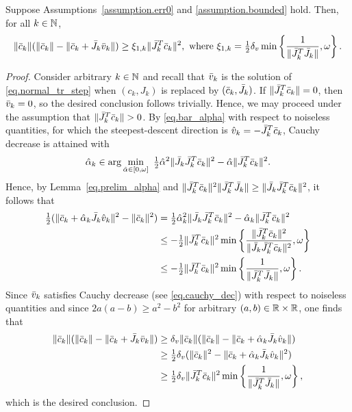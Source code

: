\begin{lemma}\label{lemma.prelim_cauchy_det}
  Suppose Assumptions~\ref{assumption.err0} and \ref{assumption.bounded} hold.  Then, for all $k \in \mathbb{N}$,
 \begin{equation*}
   \|\ctrue_k\| (\|\ctrue_k \| - \|\ctrue_k + \Jtrue_k \vtrue_k \|) \geq \xione\|\Jtrue_k^T \ctrue_k\|^2,\ \text{where}\ \xione= \tfrac{1}{2} \delta_v \min \left\{\frac{1}{\|\Jtrue_k^T \Jtrue_k\|},  \omega \right\}.
  \end{equation*}
\end{lemma}
\begin{proof}
  Consider arbitrary $k \in \mathbb{N}$ and recall that ${\bar v}_k$ is the solution of \eqref{eq.normal_tr_step} when $(c_k,J_k)$ is replaced by $({\bar c}_k,{\bar J}_k)$. If $\|{\bar J}_k^T {\bar c}_k\| = 0$, then ${\bar v}_k = 0$, so the desired conclusion follows trivially.  Hence, we may proceed under the assumption that $\|{\bar J}_k^T {\bar c}_k\| > 0$.  By \eqref{eq.bar_alpha} with respect to noiseless quantities, for which the steepest-descent direction is $\hat v_k = -{\bar J}_k^T{\bar c}_k$, Cauchy decrease is attained with
  \begin{equation*}
    \hat\alpha_k \in \arg\min_{\hat\alpha \in [0,\omega]}\ \tfrac{1}{2} \hat\alpha^2 \|{\bar J}_k {\bar J}_k^T {\bar c}_k\|^2 - \hat\alpha \|{\bar J}_k^T {\bar c}_k\|^2.
  \end{equation*}
  Hence, by Lemma~\ref{eq.prelim_alpha} and $\|{\bar J}_k^T {\bar c}_k\|^2 \|{\bar J}_k^T {\bar J}_k\| \geq {\|{\bar J}_k {\bar J}_k^T {\bar c}_k\|^2}$, it follows that
  \begin{align}
    \tfrac{1}{2} ( \|{\bar c}_k + \hat\alpha_k {\bar J}_k \hat{v}_k \|^2 - \|{\bar c}_k\|^2) &= \tfrac{1}{2} \hat\alpha_k^2 \|{\bar J}_k {\bar J}_k^T {\bar c}_k\|^2 - \hat\alpha_k \|{\bar J}_k^T {\bar c}_k \|^2 \nonumber \\
    &\leq -\tfrac{1}{2} \|{\bar J}_k^T {\bar c}_k\|^2 \min \left\{\frac{\|{\bar J}_k^T {\bar c}_k\|^2}{\|{\bar J}_k {\bar J}_k^T {\bar c}_k\|^2},  \omega \right\} \nonumber \\
    &\leq -\tfrac{1}{2} \|{\bar J}_k^T {\bar c}_k\|^2 \min \left\{\frac{1}{\|{\bar J}_k^T {\bar J}_k\|},  \omega \right\}. \label{eq.cauchy_dec_lb}
  \end{align}
  Since ${\bar v}_k$ satisfies Cauchy decrease (see \eqref{eq.cauchy_dec}) with respect to noiseless quantities and since $2 a (a - b) \geq a^2 - b^2$ for arbitrary $(a,b) \in \mathbb{R} \times \mathbb{R}$, one finds that
  \begin{align*}
    \|{\bar c}_k\| ( \|{\bar c}_k \| - \|{\bar c}_k + {\bar J}_k {\bar v}_k \|) 
    &\geq \delta_v \|{\bar c}_k\| ( \|{\bar c}_k \| - \|{\bar c}_k + \hat\alpha_k {\bar J}_k \hat{v}_k \|) \\
    &\geq  \tfrac{1}{2} \delta_v(\|{\bar c}_k\|^2 - \|{\bar c}_k + \hat\alpha_k {\bar J}_k \hat{v}_k\|^2 ) \\
    &\geq  \tfrac{1}{2}  \delta_v\|{\bar J}_k^T {\bar c}_k \|^2 \min\left\{ \frac{1}{\|{\bar J}_k^T {\bar J}_k\|}, \omega\right\},
  \end{align*}
  which is the desired conclusion.
\end{proof}

